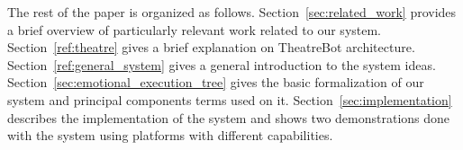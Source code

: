 The rest of the paper is organized as follows. Section~\ref{sec:related_work} provides a brief overview of particularly relevant work related to our system. Section~\ref{ref:theatre} gives a brief explanation on TheatreBot architecture. Section~\ref{ref:general_system} gives a general introduction to the system ideas. Section~\ref{sec:emotional_execution_tree} gives the basic formalization of our system and principal components terms used on it. Section~\ref{sec:implementation} describes the implementation of the system and shows two demonstrations done with the system using platforms with different capabilities.
